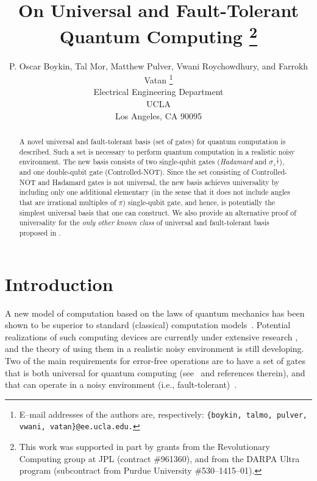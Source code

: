 \documentclass[twocolumn,11pt]{article}
\begin{document}
 

\title{On Universal and Fault-Tolerant Quantum Computing
\thanks{This work 
was supported in part by grants from the Revolutionary Computing
group at JPL (contract \#961360), and from the DARPA Ultra program
(subcontract from Purdue University \#530--1415--01).}}

\author{P. Oscar Boykin, Tal Mor, Matthew Pulver,
Vwani Roychowdhury, and Farrokh Vatan
\thanks{E--mail addresses of the authors are, respectively:
\tt \{boykin, talmo, pulver, vwani, vatan\}@ee.ucla.edu.} 
\\ \small Electrical Engineering Department \\ \small UCLA
\\ \small Los Angeles, CA 90095}

\date{}

\maketitle

\begin{abstract}
A novel universal and fault-tolerant basis (set of gates)
for quantum computation is described.  Such a set is necessary to
perform quantum computation in a realistic noisy environment. The new
basis consists
of two single-qubit gates (\emph{Hadamard} and
${\sigma_z}^{\frac{1}{4}}$), and one double-qubit gate (Controlled-NOT).
Since the set consisting of Controlled-NOT and Hadamard gates is not
universal, the new basis achieves universality by including only
one additional elementary (in the sense that it does not include
angles that are irrational multiples of $\pi$) single-qubit gate,
and hence, is 
potentially the simplest universal basis that one can construct.
We also provide an alternative
proof of universality for the {\em only other known class} of
universal and fault-tolerant basis proposed in \cite{shorFT,kitaevQC}.
\end{abstract}

\section{Introduction} 

A new model of computation based on the laws of quantum mechanics
has been shown to be superior to standard (classical) computation
models~\cite{shorFactor, Grover}.  Potential realizations
of such computing devices are currently under extensive research
\cite{cirac:zoller,monroe,turchette,haroche,Cory,CG,NMR,ESR}, and the
theory of using them in a realistic noisy environment is still developing. 
Two of the main requirements for error-free operations
are to have a set of gates that is both universal for quantum computing
(see~\cite{egfqc} and references therein), and that can operate in
a noisy environment 
(i.e., fault-tolerant)~\cite{shorQEC,shorFT,aharonov1,KLZ,kitaevQC}.
\end{document}
